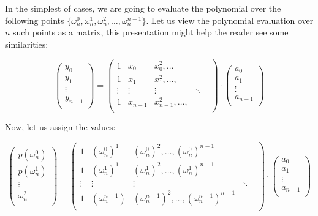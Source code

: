 In the simplest of cases, we are going to evaluate the polynomial over the following
points $ \{\omega_n^0, \omega_n^1, \omega_n^2,\dots, \omega_n^{n-1}\}$.
Let us view the polynomial evaluation over $n$ such points as a matrix, this presentation
might help the reader see some similarities:


$$
\begin{pmatrix}
  y_0\\
  y_1\\
  \vdots \\
  y_{n-1}\\
\end{pmatrix}
=
\begin{pmatrix}
  1 & x_0 & x_0^2 ,\dots\\
  1 & x_1 & x_1^2, \dots,\\
  \vdots & \vdots & \vdots & \ddots & \\
  1 & x_{n-1} & x_{n-1}^2, \dots,\\
 \end{pmatrix}
 \cdot 
\begin{pmatrix}
  a_0\\
  a_1\\
  \vdots \\
  a_{n-1}\\
\end{pmatrix}
 $$

 Now, let us assign the values:

 \label{dft-matrix}
 $$
\begin{pmatrix}
  p(\omega_n^0)\\
  p(\omega_n^1)\\
  \vdots \\
  \omega_n^2\\
\end{pmatrix}
=
\begin{pmatrix}
  1 & (\omega_n^0)^1 & (\omega_n^0)^2 ,\dots ,(\omega_n^0)^{n-1}\\
  1 & (\omega_n^1)^1 & (\omega_n^1)^2, \dots, (\omega_n^1)^{n-1}\\
  \vdots & \vdots & \vdots & \ddots & \\
  1 & (\omega_n^{n-1}) & (\omega_n^{n-1})^2, \dots,(\omega_n^{n-1})^{n-1}\\
 \end{pmatrix}
 \cdot 
\begin{pmatrix}
  a_0\\
  a_1\\
  \vdots \\
  a_{n-1}\\
\end{pmatrix}
 $$

